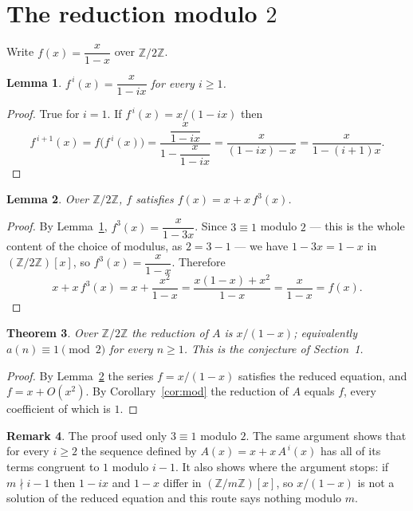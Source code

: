 \documentclass[11pt,a4paper]{article}
\theoremstyle{plain}
\newtheorem{theorem}{Theorem}
\newtheorem{lemma}[theorem]{Lemma}
\theoremstyle{definition}
\newtheorem{remark}[theorem]{Remark}
\begin{document}
\section{The reduction modulo $2$}

Write $f(x)=\dfrac{x}{1-x}$ over $\mathbb{Z}/2\mathbb{Z}$.

\begin{lemma}\label{lem:iter}
$f^{\,i}(x)=\dfrac{x}{1-ix}$ for every $i\ge1$.
\end{lemma}

\begin{proof}
True for $i=1$. If $f^{\,i}(x)=x/(1-ix)$ then
\[
f^{\,i+1}(x)=f\bigl(f^{\,i}(x)\bigr)
=\frac{\dfrac{x}{1-ix}}{1-\dfrac{x}{1-ix}}
=\frac{x}{(1-ix)-x}=\frac{x}{1-(i+1)x} .
\]
\end{proof}

\begin{lemma}\label{lem:sat}
Over $\mathbb{Z}/2\mathbb{Z}$, $f$ satisfies $f(x)=x+x\,f^{3}(x)$.
\end{lemma}

\begin{proof}
By Lemma~\ref{lem:iter}, $f^{3}(x)=\dfrac{x}{1-3x}$. Since $3\equiv1$ modulo
$2$ --- this is the whole content of the choice of modulus, as $2=3-1$ --- we have
$1-3x=1-x$ in $(\mathbb{Z}/2\mathbb{Z})[x]$, so $f^{3}(x)=\dfrac{x}{1-x}$.
Therefore
\[
x+x\,f^{3}(x)=x+\frac{x^{2}}{1-x}
=\frac{x(1-x)+x^{2}}{1-x}=\frac{x}{1-x}=f(x).
\]
\end{proof}

\begin{theorem}\label{thm:main}
Over $\mathbb{Z}/2\mathbb{Z}$ the reduction of $A$ is $x/(1-x)$; equivalently
$a(n)\equiv1\pmod{2}$ for every $n\ge1$. This is the conjecture of Section~1.
\end{theorem}

\begin{proof}
By Lemma~\ref{lem:sat} the series $f=x/(1-x)$ satisfies the reduced equation, and
$f=x+O(x^{2})$. By Corollary~\ref{cor:mod} the reduction of $A$ equals $f$, every
coefficient of which is $1$.
\end{proof}

\begin{remark}
The proof used only $3\equiv1$ modulo $2$. The same argument shows that for every
$i\ge2$ the sequence defined by $A(x)=x+x\,A^{\,i}(x)$ has all of its terms congruent to
$1$ modulo $i-1$. It also shows where the argument stops: if $m\nmid i-1$ then $1-ix$ and
$1-x$ differ in $(\mathbb{Z}/m\mathbb{Z})[x]$, so $x/(1-x)$ is not a solution of the
reduced equation and this route says nothing modulo $m$.
\end{remark}
\end{document}
